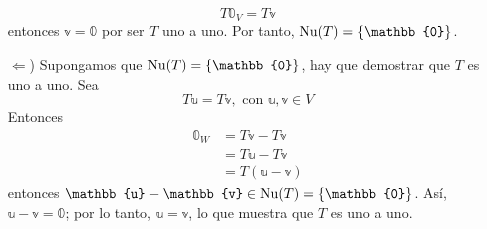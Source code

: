 \begin{theorem}
\begin{enumerate}
        $$T\mathbb{0}_V = T\mathbb{v}$$
        entonces $\mathbb{v} = \mathbb{0}$ por ser $T$ uno a uno. Por tanto, $\Nuc(T) = \{ \mathbb{0} \}$.
        \item[$\bm{\Leftarrow}$)] Supongamos que $\Nuc(T) = \{ \mathbb{0} \}$, hay que demostrar que $T$ es uno a uno. Sea
        $$T\mathbb{u} = T\mathbb{v}, \text{ con } \mathbb{u},  \mathbb{v} \in V$$
        Entonces
        \begin{align*}
            \mathbb{0}_W & = T\mathbb{v} - T\mathbb{v} \\
            & = T\mathbb{u} - T\mathbb{v} \\
            & = T(\mathbb{u} - \mathbb{v})
        \end{align*}
        entonces $\mathbb{u} - \mathbb{v} \in \Nuc(T) = \{ \mathbb{0} \}$. Así, $\mathbb{u} - \mathbb{v} = \mathbb{0}$; por lo tanto, $\mathbb{u} = \mathbb{v}$, lo que muestra que $T$ es uno a uno.
    \end{enumerate}
\end{theorem}

